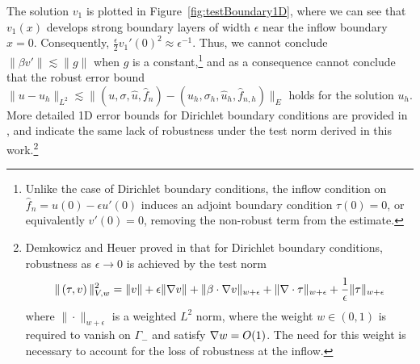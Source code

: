The solution $v_1$ is plotted in Figure~\ref{fig:testBoundary1D}, where we can see that $v_1(x)$ develops strong boundary layers of width $\epsilon$ near the inflow boundary $x=0$. Consequently, $\frac{\epsilon}{2} v_1'(0)^2 \approx \epsilon^{-1}$. Thus, we cannot conclude $\|\beta v'\| \lesssim \|g\|$ when $g$ is a constant,\footnote{Unlike the case of Dirichlet boundary conditions, the inflow condition on $ \widehat{f}_n = u(0)-\epsilon u'(0)$ induces an adjoint boundary condition $\tau(0)=0$, or equivalently $v'(0) = 0$, removing the non-robust term from the estimate.} and as a consequence cannot conclude that the robust error bound $\|u-u_h\|_{L^2} \lesssim \|(u,\sigma,\widehat{u},\widehat{f}_n)-(u_h,\sigma_h,\widehat{u}_h,\widehat{f}_{n,h})\|_E$ holds for the solution $u_h$.  More detailed 1D error bounds for Dirichlet boundary conditions are provided in \cite{DPG3}, and indicate the same lack of robustness under the test norm derived in this work.\footnote{Demkowicz and Heuer proved in \cite{DPGrobustness} that for Dirichlet boundary conditions, robustness as $\epsilon \rightarrow 0$ is achieved by the test norm
\[
\|\left(\tau, v\right)\|_{V,w}^2 = \|v\| + \epsilon \|\grad v\| + \|\beta \cdot \grad v\|_{w+\epsilon} + \| \div \tau\|_{w+\epsilon} + \frac{1}{\epsilon}\|\tau\|_{w+\epsilon}
\]
where $\|\cdot \|_{w+\epsilon}$ is a weighted $L^2$ norm, where the weight $w \in (0,1)$ is required to vanish on $\Gamma_-$ and satisfy $\grad w = O(1)$. The need for this weight is necessary to account for the loss of robustness at the inflow.} 

